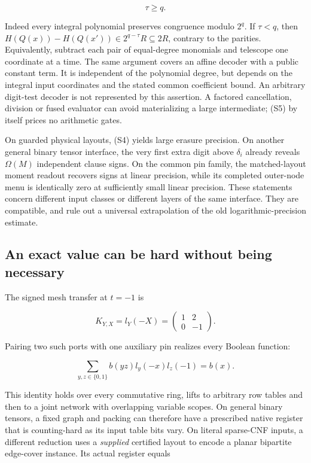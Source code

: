 \documentclass[11pt,a4paper]{article}
\begin{document}
\[
                            \tau\ge q.                        \tag{S5}
\]

Indeed every integral polynomial preserves congruence modulo \(2^q\). If
\(\tau<q\), then \(H(Q(x))-H(Q(x'))\in2^{q-\tau}R\subseteq2R\), contrary
to the parities. Equivalently, subtract each pair of equal-degree
monomials and telescope one coordinate at a time. The same argument
covers an affine decoder with a public constant term. It is independent
of the polynomial degree, but depends on the integral input coordinates
and the stated common coefficient bound. An arbitrary digit-test decoder
is not represented by this assertion. A factored cancellation, division
or fused evaluator can avoid materializing a large intermediate; (S5) by
itself prices no arithmetic gates.

On guarded physical layouts, (S4) yields large erasure precision. On
another general binary tensor interface, the very first extra digit
above \(\delta_i\) already reveals \(\Omega(M)\) independent clause
signs. On the common pin family, the matched-layout moment readout
recovers signs at linear precision, while its completed outer-node menu
is identically zero at sufficiently small linear precision. These
statements concern different input classes or different layers of the
same interface. They are compatible, and rule out a universal
extrapolation of the old logarithmic-precision estimate.

\subsection{An exact value can be hard without being
necessary}\label{v9-an-exact-value-can-be-hard-without-being-necessary}

The signed mesh transfer at \(t=-1\) is

\[
 K_{Y,X}=l_Y(-X)=\begin{pmatrix}1&2\\0&-1\end{pmatrix}.
\]

Pairing two such ports with one auxiliary pin realizes every Boolean
function:

\[
 \sum_{y,z\in\{0,1\}}b(yz)l_y(-x)l_z(-1)=b(x).
\]

This identity holds over every commutative ring, lifts to arbitrary row
tables and then to a joint network with overlapping variable scopes. On
general binary tensors, a fixed graph and packing can therefore have a
prescribed native register that is counting-hard as its input table bits
vary. On literal sparse-CNF inputs, a different reduction uses a
\emph{supplied} certified layout to encode a planar bipartite edge-cover
instance. Its actual register equals
\end{document}
